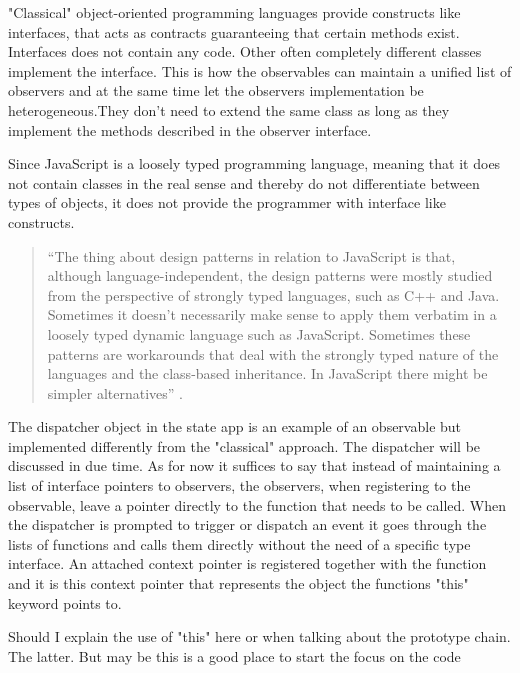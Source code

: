 \documentclass[english]{ifimaster}
\begin{document}
"Classical" object-oriented programming languages provide constructs like interfaces, that acts as contracts guaranteeing that certain methods exist. Interfaces does not contain any code. Other often completely different classes implement the interface. This is how the observables can maintain a unified list of observers and at the same time let the observers implementation be heterogeneous.They don't need to extend the same class as long as they implement the methods described in the observer interface. 

Since JavaScript is a loosely typed programming language, meaning that it does not contain classes in the real sense and thereby do not differentiate between types of objects, it does not provide the programmer with interface like constructs.  

\begin{quotation}
“The thing about design patterns in relation to JavaScript is that, although language-independent, the design patterns were mostly studied from the perspective of strongly typed languages, such as C++ and Java. Sometimes it doesn’t necessarily make sense to apply them verbatim in a loosely typed dynamic language such as JavaScript. Sometimes these patterns are workarounds that deal with the strongly typed nature of the languages and the class-based inheritance. In JavaScript there might be simpler alternatives” \parencite[s. 2]{stefanov}.
\end{quotation}

The dispatcher object in the state app is an example of an observable but implemented differently from the "classical" approach. The dispatcher will be discussed in due time. As for now it suffices to say that instead of maintaining a list of interface pointers to observers, the observers, when registering to the observable, leave a pointer directly to the function that needs to be called. When the dispatcher is prompted to trigger or dispatch an event it goes through the lists of functions and calls them directly without the need of a specific type interface. An attached context pointer is registered together with the function and it is this context pointer that represents the object the functions "this" keyword points to.

Should I explain the use of "this" here or when talking about the prototype chain. The latter. But may be this is a good place to start the focus on the code

\subsection{}
\end{document}

